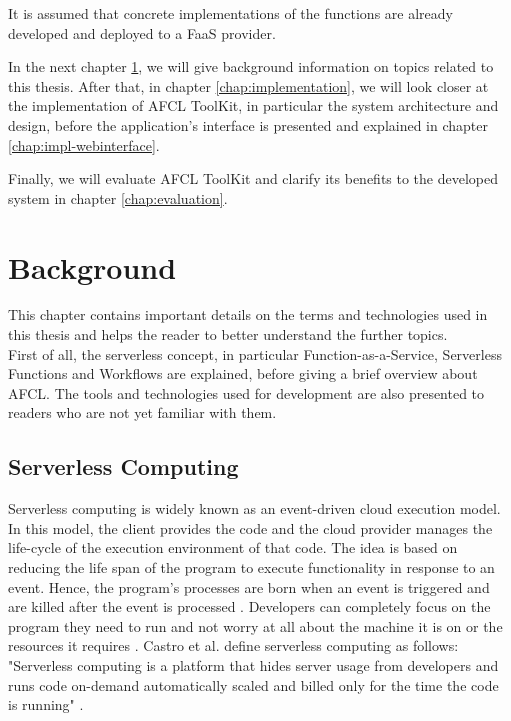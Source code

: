 \documentclass[a4paper,top=25mm,bottom=25mm,12pt,pdftex,halfparskip,twoside,bibtotoc,numbers=noenddot]{scrbook}
\begin{document}
It is assumed that concrete implementations of the functions are already developed and deployed to a FaaS provider.

In the next chapter \ref{chap:background}, we will give background information on topics related to this thesis. After that, in chapter \ref{chap:implementation}, we will look closer at the implementation of AFCL ToolKit, in particular the system architecture and design, before the application's interface is presented and explained in chapter \ref{chap:impl-webinterface}.

Finally, we will evaluate AFCL ToolKit and clarify its benefits to the developed system in chapter \ref{chap:evaluation}.


\chapter{Background}
\label{chap:background}

This chapter contains important details on the terms and technologies used in this thesis and helps the reader to better understand the further topics.\\
First of all, the serverless concept, in particular Function-as-a-Service, Serverless Functions and Workflows  are explained, before giving a brief overview about AFCL. The tools and technologies used for development are also presented to readers who are not yet familiar with them.

\section{Serverless Computing}

Serverless computing is widely known as an event-driven cloud execution model.
In this model, the client provides the code  and the cloud provider manages the life-cycle of the execution environment of that code.
The idea is based on reducing the life span of the program to execute functionality in response to an event. Hence, the program's processes are born when an event is triggered and are killed after the event is processed \cite{inproceedings-serverless-beyond-the-cloud-kanso}.
Developers can completely focus on the program they need to run and not worry at all about the machine it is on or the resources it requires \cite{articles-going-serverless-savage}.
Castro et al. define serverless computing as follows: "Serverless computing is a platform that hides server usage from developers and runs code on-demand automatically scaled and billed only for the time the code is running" \cite{articles-rise-of-serverless-castro}.
\end{document}
